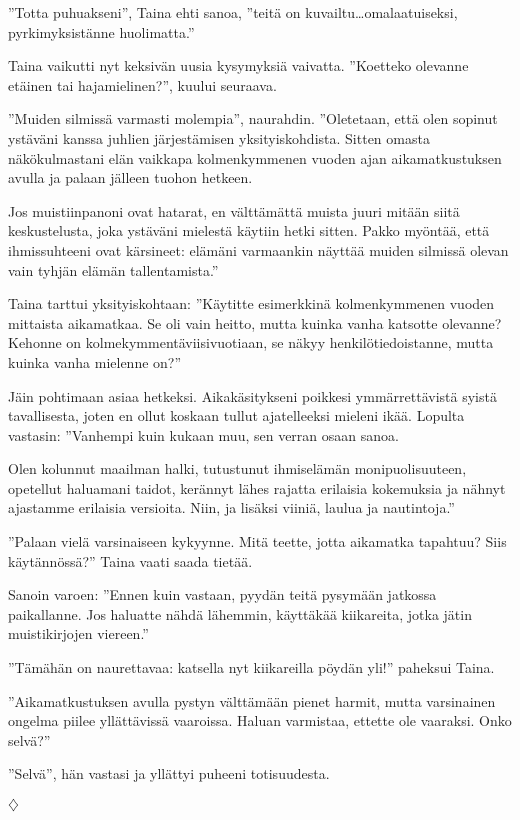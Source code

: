 ﻿\documentclass[a4paper, 12pt, finnish]{article}
\newcommand{\q}[1]{''#1''}
\def\jump{\vspace{2mm} \centerline{$\diamondsuit$} \vspace{2mm}}
\begin{document}
\q{Totta puhuakseni}, Taina ehti sanoa, \q{teitä on
kuvailtu\dots\allowbreak omalaatuiseksi, pyrkimyksistänne huolimatta.}

Taina vaikutti nyt keksivän uusia kysymyksiä vaivatta.
\q{Koetteko olevanne etäinen tai hajamielinen?}, kuului seuraava.

\q{Muiden silmissä varmasti molempia}, naurahdin. \q{Oletetaan, että
olen sopinut ystäväni kanssa juhlien järjestämisen yksityiskohdista.
Sitten omasta näkökulmastani elän vaikkapa kolmenkymmenen vuoden
ajan aikamatkustuksen avulla ja palaan jälleen tuohon hetkeen.

Jos muistiinpanoni ovat hatarat, en välttämättä muista juuri
mitään siitä keskustelusta, joka ystäväni mielestä
käytiin hetki sitten. Pakko myöntää, että ihmissuhteeni ovat
kärsineet: elämäni varmaankin näyttää muiden silmissä olevan
vain tyhjän elämän tallentamista.}

Taina tarttui yksityiskohtaan: \q{Käytitte esimerkkinä kolmenkymmenen
vuoden mittaista aikamatkaa. Se oli vain heitto, mutta kuinka
vanha katsotte olevanne? Kehonne on kolmekymmentäviisivuotiaan,
se näkyy henkilötiedoistanne, mutta kuinka vanha mielenne on?}

Jäin pohtimaan asiaa hetkeksi. Aikakäsitykseni poikkesi
ymmärrettävistä syistä tavallisesta, joten en ollut koskaan
tullut ajatelleeksi mieleni ikää. Lopulta vastasin:
\q{Vanhempi kuin kukaan muu, sen verran osaan sanoa.

Olen kolunnut maailman halki,
tutustunut ihmiselämän monipuolisuuteen, opetellut haluamani
taidot, kerännyt lähes rajatta erilaisia kokemuksia
ja nähnyt ajastamme erilaisia versioita. Niin, ja lisäksi
viiniä, laulua ja nautintoja.}

\q{Palaan vielä varsinaiseen kykyynne. Mitä teette,
jotta aikamatka tapahtuu? Siis käytännössä?} Taina vaati saada
tietää.

Sanoin varoen: \q{Ennen kuin vastaan, pyydän teitä
pysymään jatkossa paikallanne. Jos haluatte nähdä lähemmin,
käyttäkää kiikareita, jotka jätin muistikirjojen viereen.}

\q{Tämähän on naurettavaa: katsella nyt kiikareilla pöydän yli!} paheksui Taina.

\q{Aikamatkustuksen avulla pystyn välttämään pienet harmit,
mutta varsinainen ongelma piilee yllättävissä vaaroissa. Haluan
varmistaa, ettette ole vaaraksi. Onko selvä?}
 
\q{Selvä}, hän vastasi ja yllättyi puheeni totisuudesta.


\jump
\end{document}
